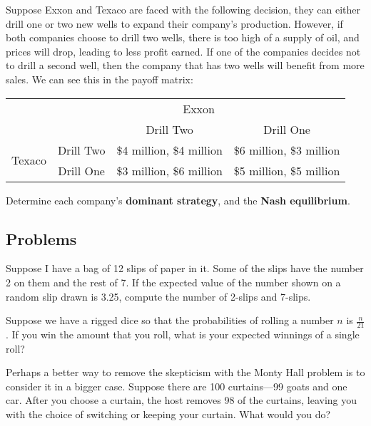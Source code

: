 \begin{problem}
Suppose Exxon and Texaco are faced with the following decision, they can either drill one or two new wells to expand their company's production. However, if both companies choose to drill two wells, there is too high of a supply of oil, and prices will drop, leading to less profit earned. If one of the companies decides not to drill a second well, then the company that has two wells will benefit from more sales. We can see this in the payoff matrix:

\begin{center}
\renewcommand{\arraystretch}{1.5} %
\begin{tabular}{cc|c|c}
     &\multicolumn{3}{c}{Exxon} \\
     && Drill Two & Drill One \\
     \cline{2-4}
     \multirow{2}{*}{Texaco}&Drill Two & \$4 million, \$4 million & \$6 million, \$3 million \\
     &Drill One & \$3 million, \$6 million & \$5 million, \$5 million
\end{tabular}
\end{center}
\end{problem}

Determine each company's \textbf{dominant strategy}, and the \textbf{Nash equilibrium}.

\subsection{Problems}
\begin{problem}
Suppose I have a bag of 12 slips of paper in it. Some of the slips have the number 2 on them and the rest of 7. If the expected value of the number shown on a random slip drawn is 3.25, compute the number of 2-slips and 7-slips.
\end{problem}

\begin{problem}
Suppose we have a rigged dice so that the probabilities of rolling a number $n$ is $\frac{n}{21}$. If you win the amount that you roll, what is your expected winnings of a single roll?
\end{problem}

\begin{problem}
Perhaps a better way to remove the skepticism with the Monty Hall problem is to consider it in a bigger case. Suppose there are 100 curtains---99 goats and one car. After you choose a curtain, the host removes 98 of the curtains, leaving you with the choice of switching or keeping your curtain. What would you do?
\end{problem}

